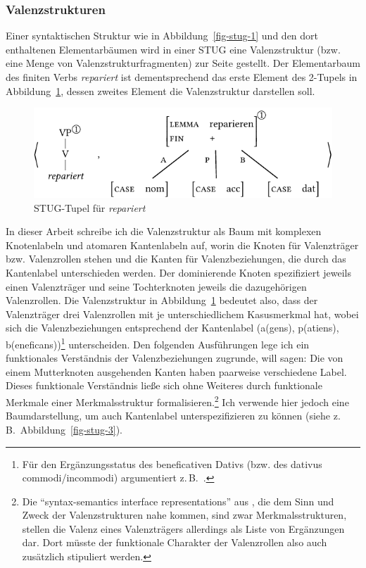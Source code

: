 \subsubsection*{Valenzstrukturen}

Einer syntaktischen Struktur wie in Abbildung~\ref{fig-stug-1} und den dort enthaltenen Elementarbäumen wird in einer STUG eine Valenzstruktur (bzw. eine Menge von Valenzstrukturfragmenten) zur Seite gestellt. Der Elementarbaum des finiten Verbs {\it repariert} ist dementsprechend das erste Element des 2-Tupels in Abbildung~\ref{fig-stug-2}, dessen zweites Element die Valenzstruktur darstellen soll.  
\begin{figure}[t]
\centering
\includegraphics{graphics/abb92.pdf}
\caption{\label{fig-stug-2}STUG-Tupel für {\it repariert}}
\end{figure}
In dieser Arbeit schreibe ich die Valenzstruktur als Baum mit komplexen Knotenlabeln und atomaren Kantenlabeln auf, worin die Knoten für Valenzträger bzw. Valenzrollen stehen und die Kanten für Valenzbeziehungen, die durch das Kantenlabel unterschieden werden. Der dominierende Knoten spezifiziert jeweils einen Valenzträger und seine Tochterknoten jeweils die dazugehörigen Valenzrollen. Die Valenzstruktur in Abbildung~\ref{fig-stug-2} bedeutet also, dass der Valenzträger drei Valenzrollen mit je unterschiedlichem Kasusmerkmal hat, wobei sich die Valenzbeziehungen entsprechend der Kantenlabel ({\sc a(gens), p(atiens), b(eneficans)})\footnote{Für den Ergänzungsstatus des beneficativen Dativs (bzw. des dativus commodi/incommodi) argumentiert z.\,B.\ \citet[115]{Wegener:85}.} unterscheiden. Den folgenden Ausführungen lege ich ein funktionales Verständnis der Valenzbeziehungen zugrunde, will sagen: Die von einem Mutterknoten ausgehenden Kanten haben paarweise verschiedene Label. Dieses funktionale Verständnis lie\ss e sich ohne Weiteres durch funktionale Merkmale einer Merkmalsstruktur formalisieren.\footnote{Die "`syntax-semantics interface representations"' aus \cite{Hahn:Meurers:11}, die dem Sinn und Zweck der Valenzstrukturen nahe kommen, sind zwar Merkmalsstrukturen, stellen die Valenz eines Valenzträgers allerdings als Liste von Ergänzungen dar. Dort müsste der funktionale Charakter der Valenzrollen also auch zusätzlich stipuliert werden.} Ich verwende hier jedoch eine Baumdarstellung, um auch Kantenlabel unterspezifizieren zu können (siehe z.\,B.\ Abbildung~\ref{fig-stug-3}).

